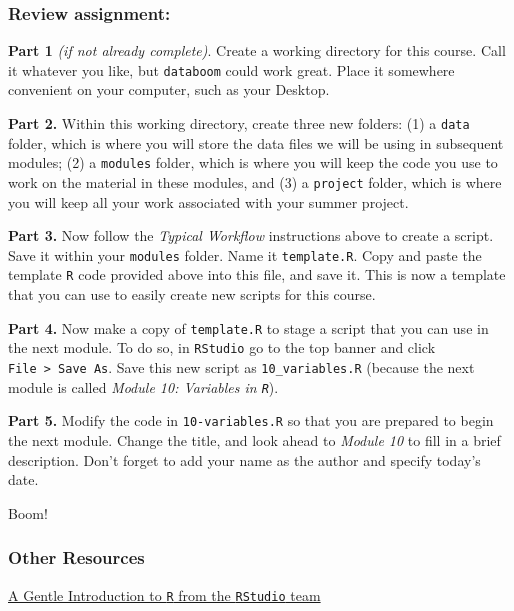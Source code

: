 \documentclass[
]{book}
\begin{document}
\hypertarget{review-assignment-1}{%
\subsubsection*{Review assignment:}\label{review-assignment-1}}

\textbf{Part 1} \emph{(if not already complete)}. Create a working directory for this course. Call it whatever you like, but \texttt{databoom} could work great. Place it somewhere convenient on your computer, such as your Desktop.

\textbf{Part 2.} Within this working directory, create three new folders: (1) a \texttt{data} folder, which is where you will store the data files we will be using in subsequent modules; (2) a \texttt{modules} folder, which is where you will keep the code you use to work on the material in these modules, and (3) a \texttt{project} folder, which is where you will keep all your work associated with your summer project.

\textbf{Part 3.} Now follow the \emph{Typical Workflow} instructions above to create a script. Save it within your \texttt{modules} folder. Name it \texttt{template.R}. Copy and paste the template \texttt{R} code provided above into this file, and save it. This is now a template that you can use to easily create new scripts for this course.

\textbf{Part 4.} Now make a copy of \texttt{template.R} to stage a script that you can use in the next module. To do so, in \texttt{RStudio} go to the top banner and click \texttt{File\ \textgreater{}\ Save\ As}. Save this new script as \texttt{10\_variables.R} (because the next module is called \emph{Module 10: Variables in \texttt{R}}).

\textbf{Part 5.} Modify the code in \texttt{10-variables.R} so that you are prepared to begin the next module. Change the title, and look ahead to \emph{Module 10} to fill in a brief description. Don't forget to add your name as the author and specify today's date.

Boom!

\hypertarget{other-resources-1}{%
\subsubsection*{Other Resources}\label{other-resources-1}}

\href{https://www.rstudio.com/resources/webinars/a-gentle-introduction-to-tidy-statistics-in-r/}{A Gentle Introduction to \texttt{R} from the \texttt{RStudio} team}
\end{document}
